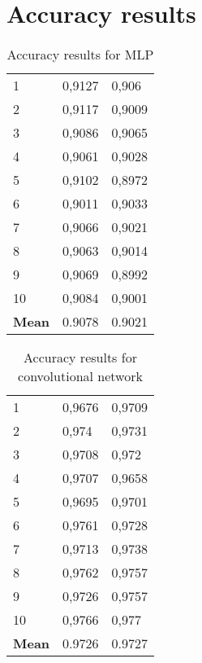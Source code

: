 \chapter{Accuracy results}
\label{res_acc}
\begin{table}[!htbp]
	\centering 
	\begin{tabular}{|l|l|l|}
		\hline
		\backslashbox{run \#}{Library}
		&\makebox[5em]{Tensorflow}&\makebox[3em]{Futhark} \\\hline\hline
		1 & 0,9127 & 0,906 \\ \hline
		2 & 0,9117 & 0,9009 \\ \hline
		3 & 0,9086 & 0,9065 \\ \hline
		4 & 0,9061 & 0,9028 \\ \hline
		5 & 0,9102 & 0,8972 \\ \hline
		6 & 0,9011 & 0,9033 \\ \hline
		7 & 0,9066 & 0,9021 \\ \hline
		8 & 0,9063 & 0,9014 \\ \hline
		9 & 0,9069 & 0,8992 \\ \hline
		10 & 0,9084 & 0,9001 \\ \hline \hline 
		\textbf{Mean} & 0.9078 & 0.9021 \\ \hline 
	\end{tabular}
    \caption{Accuracy results for MLP}
\end{table}
\newpage 
\begin{table}[!hbtp]
	\centering
	\begin{tabular}{|l|l|l|}
		\hline
		\backslashbox{run \#}{Library}
		&\makebox[5em]{Tensorflow}&\makebox[3em]{Futhark} \\\hline\hline
		1 & 0,9676 & 0,9709 \\ \hline
		2 & 0,974 & 0,9731 \\ \hline
		3 & 0,9708 & 0,972 \\ \hline
		4 & 0,9707 & 0,9658 \\ \hline
		5 & 0,9695 & 0,9701 \\ \hline
		6 & 0,9761 & 0,9728 \\ \hline
		7 & 0,9713 & 0,9738 \\ \hline
		8 & 0,9762 & 0,9757 \\ \hline
		9 & 0,9726 & 0,9757 \\ \hline
		10 & 0,9766 & 0,977 \\ \hline\hline 
		\textbf{Mean} & 0.9726 & 0.9727 \\ \hline 
	\end{tabular}
\caption{Accuracy results for convolutional network}
\end{table}
